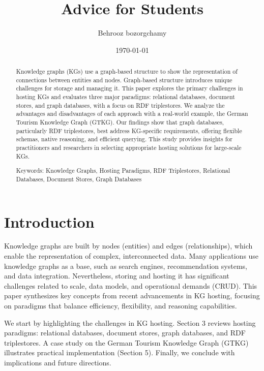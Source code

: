 \documentclass[12pt]{article}
\begin{document}
\title{Advice for Students}
\author{Behrooz bozorgchamy}
\date{\today}
\maketitle{}
\begin{abstract}
Knowledge graphs (KGs) use a graph-based structure to show the representation of connections between entities and nodes. Graph-based structure introduces unique challenges for storage and managing it. This paper explores the primary challenges in hosting KGs and evaluates three major paradigms: relational databases, document stores, and graph databases, with a focus on RDF triplestores. We analyze the advantages and disadvantages of each approach with a real-world example, the German Tourism Knowledge Graph (GTKG). Our findings show that graph databases, particularly RDF triplestores, best address KG-specific requirements, offering flexible schemas, native reasoning, and efficient querying. This study provides insights for practitioners and researchers in selecting appropriate hosting solutions for large-scale KGs.

Keywords: Knowledge Graphs, Hosting Paradigms, RDF Triplestores, Relational Databases, Document Stores, Graph Databases
\end{abstract}

\section{Introduction}
Knowledge graphs are built by nodes (entities) and edges (relationships), which enable the representation of complex, interconnected data. Many applications use knowledge graphs as a base, such as search engines, recommendation systems, and data integration. Nevertheless, storing and hosting it has significant challenges related to scale, data models, and operational demands (CRUD). This paper synthesizes key concepts from recent advancements in KG hosting, focusing on paradigms that balance efficiency, flexibility, and reasoning capabilities.

We start by highlighting the challenges in KG hosting. Section 3 reviews hosting paradigms: relational databases, document stores, graph databases, and RDF triplestores. A case study on the German Tourism Knowledge Graph (GTKG) illustrates practical implementation (Section 5). Finally, we conclude with implications and future directions.
\end{document}
